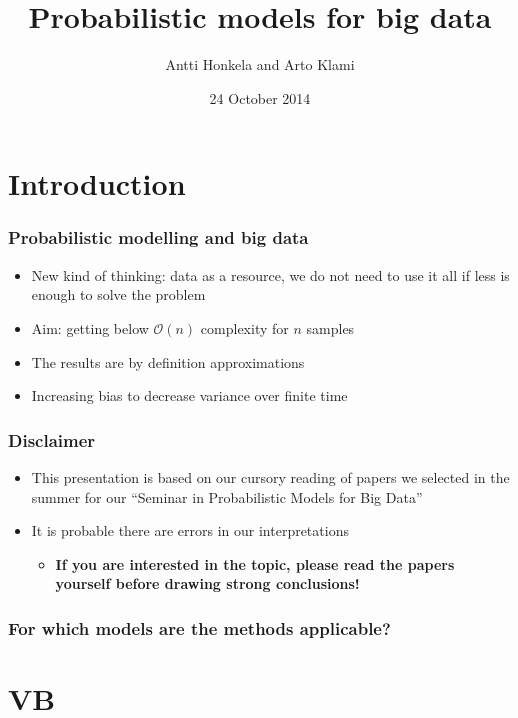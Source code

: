\documentclass{beamer}
\title{Probabilistic models for big data}
\author{Antti Honkela and Arto Klami}
\date{24 October 2014}
\begin{document}
\frame{\titlepage}


\section{Introduction}

\begin{frame}
  \frametitle{Probabilistic modelling and big data}

  \begin{itemize}
  \item New kind of thinking: data as a resource, we do not need to
    use it all if less is enough to solve the problem
  \item Aim: getting below $\mathcal{O}(n)$ complexity for $n$ samples
  \item The results are by definition approximations
  \item Increasing bias to decrease variance over finite time
  \end{itemize}
\end{frame}

\begin{frame}
  \frametitle{Disclaimer}

  \begin{itemize}
  \item This presentation is based on our cursory reading of papers we
    selected in the summer for our ``Seminar in Probabilistic Models
    for Big Data''
  \item It is probable there are errors in our interpretations
    \begin{itemize}
    \item \textbf{If you are interested in the topic, please read the
      papers yourself before drawing strong conclusions!}
    \end{itemize}
  \end{itemize}
\end{frame}

\begin{frame}
  \frametitle{For which models are the methods applicable?}
\end{frame}

\section{VB}
\end{document}
